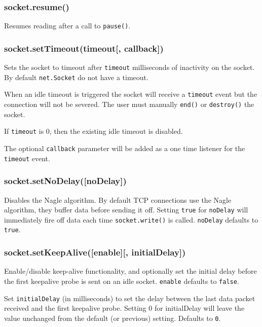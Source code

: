\subsubsection{socket.resume()}\label{socket.resume}

Resumes reading after a call to \texttt{pause()}.

\subsubsection{socket.setTimeout(timeout{[},
callback{]})}\label{socket.settimeouttimeout-callback}

Sets the socket to timeout after \texttt{timeout} milliseconds of
inactivity on the socket. By default \texttt{net.Socket} do not have a
timeout.

When an idle timeout is triggered the socket will receive a
\texttt{\textquotesingle{}timeout\textquotesingle{}} event but the
connection will not be severed. The user must manually \texttt{end()} or
\texttt{destroy()} the socket.

If \texttt{timeout} is 0, then the existing idle timeout is disabled.

The optional \texttt{callback} parameter will be added as a one time
listener for the \texttt{\textquotesingle{}timeout\textquotesingle{}}
event.

\subsubsection{socket.setNoDelay({[}noDelay{]})}\label{socket.setnodelaynodelay}

Disables the Nagle algorithm. By default TCP connections use the Nagle
algorithm, they buffer data before sending it off. Setting \texttt{true}
for \texttt{noDelay} will immediately fire off data each time
\texttt{socket.write()} is called. \texttt{noDelay} defaults to
\texttt{true}.

\subsubsection{socket.setKeepAlive({[}enable{]}{[},
initialDelay{]})}\label{socket.setkeepaliveenable-initialdelay}

Enable/disable keep-alive functionality, and optionally set the initial
delay before the first keepalive probe is sent on an idle socket.
\texttt{enable} defaults to \texttt{false}.

Set \texttt{initialDelay} (in milliseconds) to set the delay between the
last data packet received and the first keepalive probe. Setting 0 for
initialDelay will leave the value unchanged from the default (or
previous) setting. Defaults to \texttt{0}.

